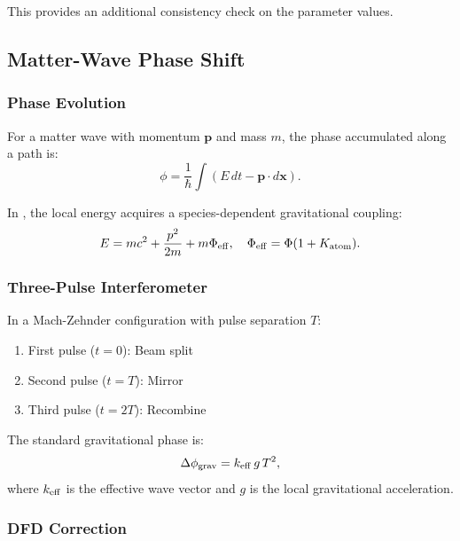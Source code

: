 This provides an additional consistency check on the parameter values.

\subsection{Matter-Wave Phase Shift}\label{app:matter_wave}

\subsubsection{Phase Evolution}

For a matter wave with momentum $\mathbf{p}$ and mass $m$, the phase 
accumulated along a path is:
\begin{equation}
\phi = \frac{1}{\hbar}\int \left(E\,dt - \mathbf{p}\cdot d\mathbf{x}\right).
\end{equation}

In \DFD, the local energy acquires a species-dependent gravitational 
coupling:
\begin{equation}
E = mc^2 + \frac{p^2}{2m} + m\Phi_{\rm eff}, \quad \Phi_{\rm eff} = \Phi(1 + K_{\rm atom}).
\end{equation}

\subsubsection{Three-Pulse Interferometer}

In a Mach-Zehnder configuration with pulse separation $T$:
\begin{enumerate}
\item First pulse ($t=0$): Beam split
\item Second pulse ($t=T$): Mirror
\item Third pulse ($t=2T$): Recombine
\end{enumerate}

The standard gravitational phase is:
\begin{equation}
\Delta\phi_{\rm grav} = k_{\rm eff}\,g\,T^2,
\end{equation}
where $k_{\rm eff}$ is the effective wave vector and $g$ is the local 
gravitational acceleration.

\subsubsection{DFD Correction}

